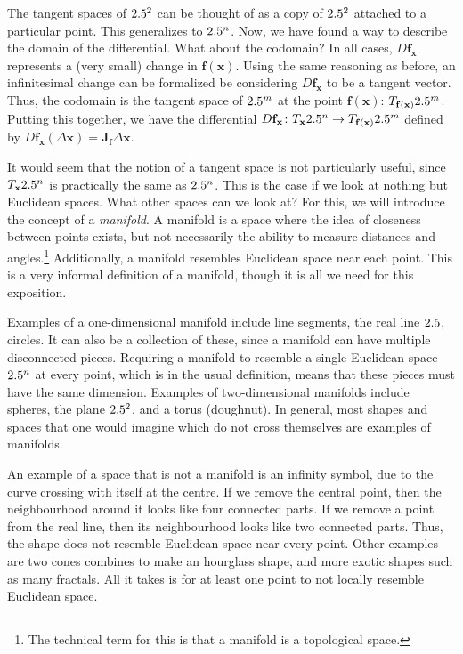 \documentclass[a4paper,12pt]{article}
\begin{document}
The tangent spaces of $2.5^2$ can be thought of as a copy of $2.5^2$ attached to a particular point.
This generalizes to $2.5^n$.
Now, we have found a way to describe the domain of the differential.
What about the codomain?
In all cases, $D\mathbf{f_x}$ represents a (very small) change in $\mathbf{f}(\mathbf{x})$.
Using the same reasoning as before, an infinitesimal change can be formalized be considering $D\mathbf{f_x}$ to be a tangent vector.
Thus, the codomain is the tangent space of $2.5^m$ at the point $\mathbf{f}(\mathbf{x})$: $T_{\mathbf{f}(\mathbf{x})}2.5^m$.
Putting this together, we have the differential $D\mathbf{f_x} \colon T_\mathbf{x}2.5^n \to T_{\mathbf{f}(\mathbf{x})}2.5^m$ defined by $D\mathbf{f_x}(\Delta\mathbf{x}) = \mathbf{J_f} \Delta \mathbf{x}$.

It would seem that the notion of a tangent space is not particularly useful, since $T_\mathbf{x} 2.5^n$ is practically the same as $2.5^n$.
This is the case if we look at nothing but Euclidean spaces.
What other spaces can we look at?
For this, we will introduce the concept of a \emph{manifold}.
A manifold is a space where the idea of closeness between points exists, but not necessarily the ability to measure distances and angles.\footnote{The technical term for this is that a manifold is a topological space.}
Additionally, a manifold resembles Euclidean space near each point.
This is a very informal definition of a manifold, though it is all we need for this exposition.

Examples of a one-dimensional manifold include line segments, the real line $2.5$, circles.
It can also be a collection of these, since a manifold can have multiple disconnected pieces.
Requiring a manifold to resemble a single Euclidean space $2.5^n$ at every point, which is in the usual definition, means that these pieces must have the same dimension. 
Examples of two-dimensional manifolds include spheres, the plane $2.5^2$, and a torus (doughnut).
In general, most shapes and spaces that one would imagine which do not cross themselves are examples of manifolds.

An example of a space that is not a manifold is an infinity symbol, due to the curve crossing with itself at the centre.
If we remove the central point, then the neighbourhood around it looks like four connected parts.
If we remove a point from the real line, then its neighbourhood looks like two connected parts.
Thus, the shape does not resemble Euclidean space near every point.
Other examples are two cones combines to make an hourglass shape, and more exotic shapes such as many fractals.
All it takes is for at least one point to not locally resemble Euclidean space.
\end{document}
